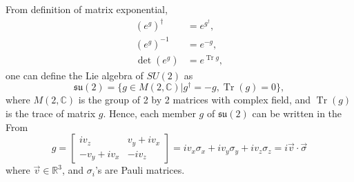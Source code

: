 \documentclass[12pt]{revtex4-2}
\DeclareMathOperator{\Tr}{Tr}
\begin{document}
From definition of matrix exponential,
\begin{equation}
    \begin{aligned}
        (e^g)^\dagger &= e^{g^\dagger}, \\
        (e^g)^{-1} &= e^{-g}, \\
        \det(e^g) &= e^{\Tr g},
    \end{aligned}
\end{equation}
one can define the Lie algebra of $SU(2)$ as
\begin{equation}
    \mathfrak{su(2)} = \{g \in M(2, \mathbb{C})|g^\dagger=-g, \Tr(g) = 0\},
\end{equation}
where $M(2,\mathbb{C})$ is the group of 2 by 2 matrices with complex field, and $\Tr(g)$ is the trace of matrix $g$. Hence, each member $g$ of $\mathfrak{su(2)}$ can be written in the From
\begin{equation}
    g = \begin{bmatrix}
            iv_z & v_y+iv_x \\
            -v_y+iv_x & -iv_z
        \end{bmatrix}
      = iv_x\sigma_x + iv_y\sigma_y + iv_z\sigma_z = i\vec{v}\cdot\vec{\sigma}
\end{equation}
where $\vec{v} \in \mathbb{R}^3$, and $\sigma_i$'s are Pauli matrices.
\end{document}
